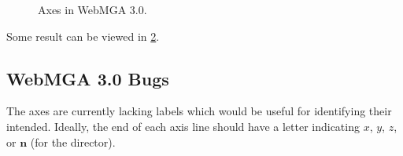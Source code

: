 \begin{figure}
\begin{center}
\begin{subfigure}{0.4\textwidth}
      \caption{}
      \label{fig:2_new_2}
    \end{subfigure}
  \end{center}
  \caption{Axes in WebMGA 3.0.}
  \label{fig:new_axes}
\end{figure}

Some result can be viewed in \cref{fig:new_axes}.

\subsection{WebMGA 3.0 Bugs}
The axes are currently lacking labels which would be useful for identifying their intended. Ideally, the end of each axis line should have a letter indicating $x$, $y$, $z$, or $\mathbf{n}$ (for the director).

